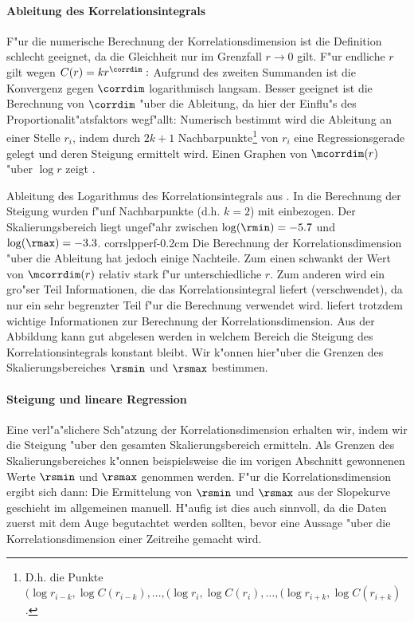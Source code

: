 \paragraph{Ableitung des Korrelationsintegrals}
F"ur die numerische Berechnung der Korrelationsdimension ist die Definition
 schlecht geeignet, da die Gleichheit nur im Grenzfall $r\to 0$ gilt. F"ur 
endliche $r$ gilt wegen $C(r)=k r^{\corrdim}:$
Aufgrund des zweiten Summanden ist die Konvergenz gegen $\corrdim$ logarithmisch langsam.
Besser geeignet ist die Berechnung von $\corrdim$ "uber die Ableitung, da hier der Einflu"s
des Proportionalit"atsfaktors wegf"allt:
Numerisch bestimmt wird die Ableitung an einer Stelle $r_i$, indem durch $2k+1$
Nachbarpunkte\footnote{D.h. die Punkte $(\log r_{i-k}, \log C(r_{i-k}),\dots,(\log r_i,
\log C(r_i),\dots,(\log r_{i+k}, \log C(r_{i+k})$. } von $r_i$ eine Regressionsgerade
gelegt und deren Steigung ermittelt wird. Einen Graphen von $\mcorrdim(r)$ "uber $\log r$
zeigt .

{Ableitung des Logarithmus des Korrelationsintegrals aus . In die
Berechnung der Steigung wurden f"unf Nachbarpunkte (d.h. $k=2$) mit einbezogen. Der
Skalierungsbereich liegt ungef"ahr zwischen $\log(\rmin)=-5.7$ und $\log(\rmax)=-3.3$.}
{corrslpperf}{-0.2cm}
Die Berechnung der Korrelationsdimension "uber die Ableitung hat jedoch einige
Nachteile. Zum einen schwankt der Wert von $\mcorrdim(r)$ relativ stark f"ur
unterschiedliche $r$. Zum anderen wird ein gro"ser Teil Informationen, die das
Korrelationsintegral liefert \naja(verschwendet), da nur ein sehr begrenzter Teil f"ur
die Berechnung verwendet wird.  liefert trotzdem wichtige Informationen zur 
Berechnung der Korrelationsdimension. Aus der Abbildung 
kann gut abgelesen werden in welchem Bereich die Steigung des
Korrelationsintegrals konstant bleibt. Wir k"onnen hier"uber die Grenzen des
Skalierungsbereiches $\rsmin$ und $\rsmax$ bestimmen. 

\paragraph{Steigung und lineare Regression}
Eine verl"a"slichere Sch"atzung der Korrelationsdimension erhalten wir, indem wir die
Steigung "uber den gesamten Skalierungsbereich ermitteln. Als Grenzen des
Skalierungsbereiches k"onnen beispielsweise die im vorigen Abschnitt gewonnenen Werte
$\rsmin$ und $\rsmax$ genommen werden. F"ur die Korrelationsdimension ergibt sich dann:
Die Ermittelung von $\rsmin$ und $\rsmax$ aus der Slopekurve geschieht im allgemeinen
manuell. H"aufig ist dies auch sinnvoll, da die Daten zuerst mit dem Auge begutachtet
werden sollten, bevor eine Aussage "uber die Korrelationsdimension einer Zeitreihe gemacht
wird. 

